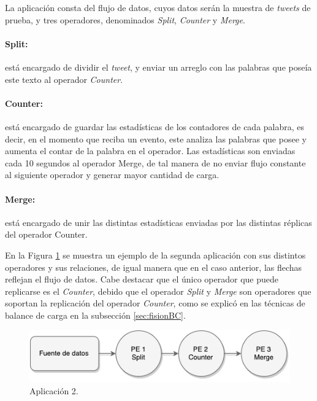 La aplicación consta del flujo de datos, cuyos datos serán la muestra de \textit{tweets} de prueba, y tres operadores, denominados \textit{Split}, \textit{Counter} y \textit{Merge}.

\paragraph{Split:} está encargado de dividir el \textit{tweet}, y enviar un arreglo con las palabras que poseía este texto al operador \textit{Counter}.

\paragraph{Counter:} está encargado de guardar las estadísticas de los contadores de cada palabra, es decir, en el momento que reciba un evento, este analiza las palabras que posee y aumenta el contar de la palabra en el operador. Las estadísticas son enviadas cada 10 segundos al operador Merge, de tal manera de no enviar flujo constante al siguiente operador y generar mayor cantidad de carga.

\paragraph{Merge:} está encargado de unir las distintas estadísticas enviadas por las distintas réplicas del operador Counter.

En la Figura \ref{fig:segundaAplicacion} se muestra un ejemplo de la segunda aplicación con sus distintos operadores y sus relaciones, de igual manera que en el caso anterior, las flechas reflejan el flujo de datos. Cabe destacar que el único operador que puede replicarse es el \textit{Counter}, debido que el operador \textit{Split} y \textit{Merge} son operadores que soportan la replicación del operador \textit{Counter}, como se explicó en las técnicas de balance de carga en la subsección \ref{sec:fisionBC}.

\begin{figure}[!ht]
	\centering
		\includegraphics[scale=0.75]{images/App2.pdf}
	\caption{Aplicación 2.}
	\label{fig:segundaAplicacion}
\end{figure}

